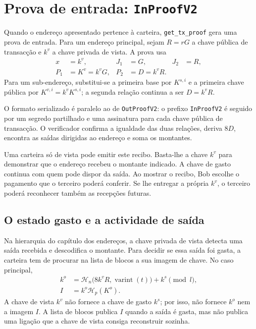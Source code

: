 \section{Prova de entrada: \texttt{InProofV2}}
\label{subsec:proofs-output-ownership-inproof}

%
Quando o endereço apresentado pertence à carteira, \texttt{get\_tx\_proof}
gera uma prova de entrada. Para um endereço principal, sejam \(R=rG\) a chave
pública de transacção e \(k^v\) a chave privada de vista. A prova usa
\begin{align*}
 x&=k^v, & J_1&=G, & J_2&=R,\\
 P_1&=K^v=k^vG, & P_2&=D=k^vR.
\end{align*}
Para um sub-endereço, substitui-se a primeira base por \(K^{s,i}\) e a
primeira chave pública por
\(K^{v,i}=k^vK^{s,i}\); a segunda relação continua a ser
\(D=k^vR\).

%
O formato serializado é paralelo ao de \texttt{OutProofV2}: o prefixo
\texttt{InProofV2} é seguido por um segredo partilhado e uma assinatura para
cada chave pública de transacção. O verificador confirma a igualdade das duas
relações, deriva \(8D\), encontra as saídas dirigidas ao endereço e soma os
montantes.

Uma carteira só de vista pode emitir este recibo. Basta-lhe a chave \(k^v\)
para demonstrar que o endereço recebeu o montante indicado. A chave de
gasto continua com quem pode dispor da saída. Ao mostrar o recibo, Bob
escolhe o pagamento que o terceiro poderá conferir. Se lhe entregar a
própria \(k^v\), o terceiro poderá reconhecer também as recepções futuras.



\subsection{O estado gasto e a actividade de saída}
\label{subsec:proofs-view-key-limit}

Na hierarquia do capítulo dos endereços, a chave privada de vista detecta uma saída
recebida e descodifica o montante. Para decidir se essa saída foi gasta, a
carteira tem de procurar na lista de blocos a sua imagem de chave. No caso
principal,
\begin{align*}
 k^o&=\mathcal H_n\bigl(8k^vR,\operatorname{varint}(t)\bigr)+k^s\pmod l,\\
 I&=k^o\mathcal H_p(K^o).
\end{align*}
A chave de vista \(k^v\) não fornece a chave de gasto \(k^s\); por isso, não
fornece \(k^o\) nem a imagem \(I\). A lista de blocos publica \(I\) quando a
saída é gasta, mas não publica uma ligação que a chave de vista consiga
reconstruir sozinha.

